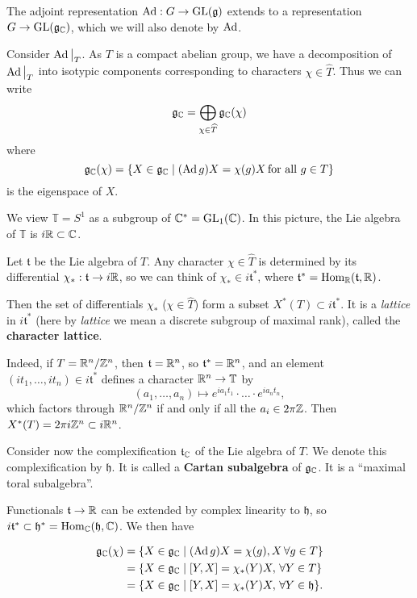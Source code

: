 \documentclass[11pt, english]{article}
\begin{document}
The adjoint representation $\operatorname{Ad}:G \to \operatorname{GL}(\mathfrak g)$ extends to a representation $G \to \operatorname{GL}(\mathfrak g_{\mathbb{C}})$, which we will also denote by $\operatorname{Ad}$.

Consider $\restr{\Ad}{T}$. As $T$ is a compact abelian group, we have a decomposition of $\restr{\Ad}{T}$ into isotypic components corresponding to characters $\chi \in \widehat T$. Thus we can write
$$
\mathfrak g_{\mathbb{C}} = \bigoplus_{\chi \in \widehat T} \mathfrak g_{\mathbb{C}}(\chi)
$$
where
$$
\mathfrak g_{\mathbb{C}}(\chi) = \{ X \in \mathfrak g_{\mathbb{C}} \mid (\operatorname{Ad} g)X = \chi(g) X \, \text{for all } g \in T \}
$$
is the eigenspace of $X$.

We view $\mathbb T = S^1$ as a subgroup of $\mathbb{C}^\ast = \operatorname{GL}_1(\mathbb{C})$. In  this picture, the Lie algebra of $\mathbb T$ is $i \mathbb{R} \subset \mathbb{C}$.

Let $\mathfrak t$ be the Lie algebra of $T$. Any character $\chi \in \widehat T$ is determined by its differential $\chi_\ast:\mathfrak t \to i \mathbb{R}$, so we can think of $\chi_\ast \in i \mathfrak t^\ast$, where $\mathfrak t ^\ast = \operatorname{Hom}_{\mathbb{R}}(\mathfrak t,\mathbb{R})$.

Then the set of differentials $\chi_\ast$ ($\chi \in \widehat T$) form a subset $X^\ast(T) \subset i \mathfrak t ^\ast$. It is a \emph{lattice} in $i \mathfrak t^\ast$ (here by \emph{lattice} we mean a discrete subgroup of maximal rank), called the \textbf{character lattice}.

Indeed, if $T=\mathbb{R}^n/\mathbb{Z}^n$, then $\mathfrak t=\mathbb{R}^n$, so $\mathfrak t^\ast=\mathbb{R}^n$, and an element $(it_1,\ldots,it_n) \in i\mathfrak t^\ast$ defines a character $\mathbb{R}^n \to \mathbb T$ by 
$$
(a_1, \ldots,a_n) \mapsto e^{ia_1t_1}\cdot \ldots \cdot e^{ia_nt_n},
$$
which factors through $\mathbb{R}^n/\mathbb{Z}^n$ if and only if all the $a_i \in 2\pi \mathbb{Z}$. Then $X^\ast(T) = 2\pi i \mathbb{Z}^n \subset i \mathbb{R}^n$.

Consider now the complexification $\mathfrak t_{\mathbb{C}}$ of the Lie algebra of $T$. We denote this complexification by $\mathfrak h$. It is called a \textbf{Cartan subalgebra} of $\mathfrak g_{\mathbb{C}}$. It is a ``maximal toral subalgebra''.

Functionals $\mathfrak t \to \mathbb{R}$ can be extended by complex linearity to $\mathfrak h$, so $i \mathfrak t^\ast \subset \mathfrak h^\ast = \operatorname{Hom}_{\mathbb{C}}(\mathfrak h, \mathbb{C})$. We then have

\begin{align*}
  \mathfrak g_{\mathbb{C}}(\chi) &= \{ X \in \mathfrak g_{\mathbb{C}} \mid (\operatorname{Ad} g)X = \chi(g), X\, \forall g \in T \} \\
&= \{ X \in \mathfrak g_{\mathbb{C}} \mid [Y,X] = \chi_\ast(Y)X, \,\forall Y \in T \} \\
&= \{ X \in \mathfrak g_{\mathbb{C}} \mid [Y,X] = \chi_\ast(Y)X, \, \forall Y \in \mathfrak h \}.
\end{align*}
\end{document}
